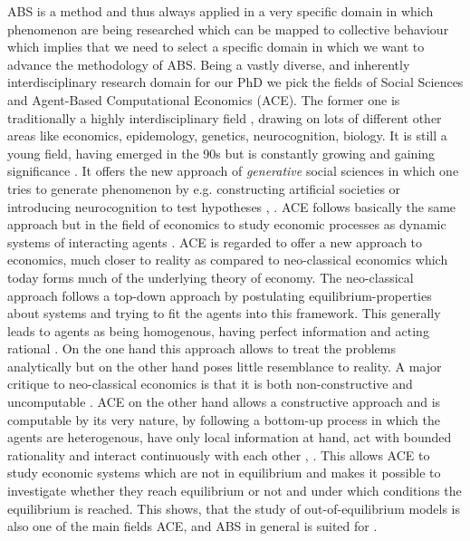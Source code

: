 ABS is a method and thus always applied in a very specific domain in which phenomenon are being researched which can be mapped to collective behaviour which implies that we need to select a specific domain in which we want to advance the methodology of ABS. Being a vastly diverse, and inherently interdisciplinary research domain \cite{niazi_agent-based_2011} for our PhD we pick the fields of Social Sciences and Agent-Based Computational Economics (ACE). The former one is traditionally a highly interdisciplinary field \cite{axelrod_chapter_2006}, drawing on lots of different other areas like economics, epidemology, genetics, neurocognition, biology. It is still a young field, having emerged in the 90s but is constantly growing and gaining significance \cite{axelrod_advancing_1997}. It offers the new approach of \textit{generative} social sciences in which one tries to generate phenomenon by e.g. constructing artificial societies or introducing neurocognition to test hypotheses \cite{epstein_growing_1996}, \cite{epstein_agent_zero:_2014}.
ACE follows basically the same approach but in the field of economics to study economic processes as dynamic systems of interacting agents \cite{tesfatsion_agent-based_2006}. ACE is regarded to offer a new approach to economics, much closer to reality as compared to neo-classical economics which today forms much of the underlying theory of economy. The neo-classical approach follows a top-down approach by postulating equilibrium-properties about systems and trying to fit the agents into this framework. This generally leads to agents as being homogenous, having perfect information and acting rational \cite{kirman_complex_2010}. On the one hand this approach allows to treat the problems analytically but on the other hand poses little resemblance to reality. A major critique to neo-classical economics is that it is both non-constructive and uncomputable \cite{velupillai_unreasonable_2005}.
ACE on the other hand allows a constructive approach and is computable by its very nature, by following a bottom-up process in which the agents are heterogenous, have only local information at hand, act with bounded rationality and interact continuously with each other \cite{tesfatsion_modeling_2017}, \cite{kirman_complex_2010}. This allows ACE to study economic systems which are not in equilibrium and makes it possible to investigate whether they reach equilibrium or not and under which conditions the equilibrium is reached. This shows, that the study of out-of-equilibrium models is also one of the main fields ACE, and ABS in general is suited for \cite{epstein_generative_2012}.

